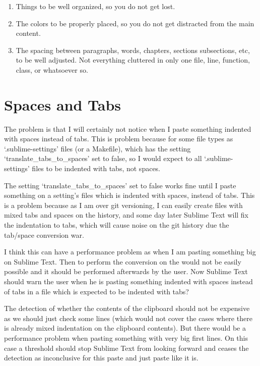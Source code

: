 \begin{englishtext}
    \begin{enumerate}
        \item Things to be well organized, so you do not get lost.

        \item The colors to be properly placed, so you do not get distracted
           from the main content.

        \item The spacing between paragraphs, words, chapters, sections
           subsections, etc, to be well adjusted. Not everything cluttered in
           only one file, line, function, class, or whatsoever so.
    \end{enumerate}



    \section{Spaces and Tabs}

    The problem is that I will certainly not notice when I paste something
    indented with spaces instead of tabs. This is problem because for some file
    types as `.sublime-settings' files (or a Makefile), which has the setting
    `translate\_tabs\_to\_spaces' set to false, so I would expect to all
    `.sublime-settings' files to be indented with tabs, not spaces.
    \cite{tabsAndSpacesConversion}

    The setting `translate\_tabs\_to\_spaces' set to false works fine until I paste
    something on a setting's files which is indented with spaces, instead of
    tabs. This is a problem because as I am over git versioning, I can easily
    create files with mixed tabs and spaces on the history, and some day later
    Sublime Text will fix the indentation to tabs, which will cause noise on the
    git history due the tab/space conversion war. %

    I think this can have a performance problem as when I am pasting something
    big on Sublime Text. Then to perform the conversion on the would not be
    easily possible and it should be performed afterwards by the user. Now
    Sublime Text should warn the user when he is pasting something indented with
    spaces instead of tabs in a file which is expected to be indented with tabs?

    The detection of whether the contents of the clipboard should not be
    expensive as we should just check some lines (which would not cover the
    cases where there is already mixed indentation on the clipboard contents).
    But there would be a performance problem when pasting something with very
    big first lines. On this case a threshold should stop Sublime Text from
    looking forward and ceases the detection as inconclusive for this paste and
    just paste like it is.




\end{englishtext}
